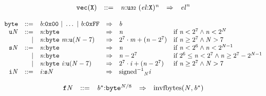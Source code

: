 \vspace{1ex}

$$
\begin{array}{@{}l@{}rrlll@{}l@{}}
& {\mathtt{vec}}({\mathtt{X}}) &::=& {\mathit{n}}{:}{\mathtt{u{\scriptstyle32}}}~{({\mathit{el}}{:}{\mathtt{X}})^{{\mathit{n}}}} &\Rightarrow& {{\mathit{el}}^{{\mathit{n}}}} \\
\end{array}
$$

\vspace{1ex}

\vspace{1ex}

$$
\begin{array}{@{}l@{}rrlll@{}l@{}}
& {\mathtt{byte}} &::=& {\mathit{b}}{:}\mathtt{0x00} ~|~ \dots ~|~ {\mathit{b}}{:}\mathtt{0xFF} &\Rightarrow& {\mathit{b}} \\
& {{\mathtt{u}}}{{\mathit{N}}} &::=& {\mathit{n}}{:}{\mathtt{byte}} &\Rightarrow& {\mathit{n}} &\quad
  \mbox{if}~{\mathit{n}} < {2^{7}} \land {\mathit{n}} < {2^{{\mathit{N}}}} \\ &&|&
{\mathit{n}}{:}{\mathtt{byte}}~{\mathit{m}}{:}{{\mathtt{u}}}{({\mathit{N}} - 7)} &\Rightarrow& {2^{7}} \cdot {\mathit{m}} + ({\mathit{n}} - {2^{7}}) &\quad
  \mbox{if}~{\mathit{n}} \geq {2^{7}} \land {\mathit{N}} > 7 \\
& {{\mathtt{s}}}{{\mathit{N}}} &::=& {\mathit{n}}{:}{\mathtt{byte}} &\Rightarrow& {\mathit{n}} &\quad
  \mbox{if}~{\mathit{n}} < {2^{6}} \land {\mathit{n}} < {2^{{\mathit{N}} - 1}} \\ &&|&
{\mathit{n}}{:}{\mathtt{byte}} &\Rightarrow& {\mathit{n}} - {2^{7}} &\quad
  \mbox{if}~{2^{6}} \leq {\mathit{n}} < {2^{7}} \land {\mathit{n}} \geq {2^{7}} - {2^{{\mathit{N}} - 1}} \\ &&|&
{\mathit{n}}{:}{\mathtt{byte}}~{\mathit{i}}{:}{{\mathtt{u}}}{({\mathit{N}} - 7)} &\Rightarrow& {2^{7}} \cdot {\mathit{i}} + ({\mathit{n}} - {2^{7}}) &\quad
  \mbox{if}~{\mathit{n}} \geq {2^{7}} \land {\mathit{N}} > 7 \\
& {{\mathtt{i}}}{{\mathit{N}}} &::=& {\mathit{i}}{:}{{\mathtt{s}}}{{\mathit{N}}} &\Rightarrow& {{{{{\mathrm{signed}}^{{-1}}}}{}}_{{\mathit{N}}}}{{\mathit{i}}} \\
\end{array}
$$

\vspace{1ex}

$$
\begin{array}{@{}l@{}rrlll@{}l@{}}
& {{\mathtt{f}}}{{\mathit{N}}} &::=& {{\mathit{b}}^\ast}{:}{{\mathtt{byte}}^{{\mathit{N}} / 8}} &\Rightarrow& {\mathrm{invfbytes}}({\mathit{N}}, {{\mathit{b}}^\ast}) \\
\end{array}
$$

